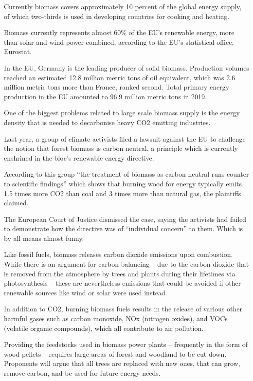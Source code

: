 \documentclass[
]{book}
\begin{document}
Currently biomass covers approximately 10 percent of the global energy supply, of which two-thirds is used in developing countries for cooking and heating.

Biomass currently represents almost 60\% of the EU's renewable energy, more than solar and wind power combined, according to the EU's statistical office, Eurostat.

In the EU, Germany is the leading producer of solid biomass. Production volumes reached an estimated 12.8 million metric tons of oil equivalent, which was 2.6 million metric tons more than France, ranked second. Total primary energy production in the EU amounted to 96.9 million metric tons in 2019.

One of the biggest problems related to large scale biomass supply is the energy density that is needed to decarbonise heavy CO2 emitting industries.

Last year, a group of climate activists filed a lawsuit against the EU to challenge the notion that forest biomass is carbon neutral, a principle which is currently enshrined in the bloc's renewable energy directive.

According to this group ``the treatment of biomass as carbon neutral runs counter to scientific findings'' which shows that burning wood for energy typically emits 1.5 times more CO2 than coal and 3 times more than natural gas, the plaintiffs claimed.

The European Court of Justice dismissed the case, saying the activists had failed to demonstrate how the directive was of ``individual concern'' to them. Which is by all means almost funny.

Like fossil fuels, biomass releases carbon dioxide emissions upon combustion. While there is an argument for carbon balancing -- due to the carbon dioxide that is removed from the atmosphere by trees and plants during their lifetimes via photosynthesis -- these are nevertheless emissions that could be avoided if other renewable sources like wind or solar were used instead.

In addition to CO2, burning biomass fuels results in the release of various other harmful gases such as carbon monoxide, NOx (nitrogen oxides), and VOCs (volatile organic compounds), which all contribute to air pollution.

Providing the feedstocks used in biomass power plants -- frequently in the form of wood pellets -- requires large areas of forest and woodland to be cut down. Proponents will argue that all trees are replaced with new ones, that can grow, remove carbon, and be used for future energy needs.
\end{document}

